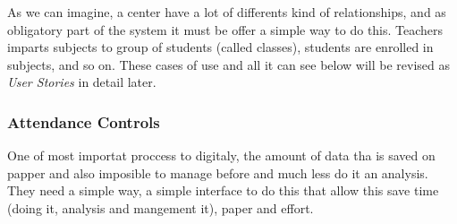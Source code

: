 \noindent{}

\noindent{}

As we can imagine, a center have a lot of differents kind of relationships, and as obligatory part of the system it must be offer a simple way to do this. Teachers imparts subjects to group of students (called classes), students are enrolled in subjects, and so on. These cases of use and all it can see below will be revised as \textit{User Stories} in detail later.

\break
\subsubsection{Attendance Controls}
\bigskip

One of most importat proccess to digitaly, the amount of data tha is saved on
papper and also imposible to manage before and much less do it an analysis.
They need a simple way, a simple interface to do this that allow this save time
(doing it, analysis and mangement it), paper and effort.

